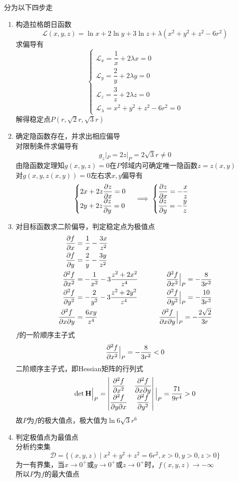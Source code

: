 \begin{analysis}
分为以下四步走
\begin{enumerate}
\item 构造拉格朗日函数
\[\mathcal{L}(x,y,z)=\ln x+2\ln y+3\ln z+\lambda(x^2+y^2+z^2-6r^2)\]
求偏导有
\[\begin{cases}
\mathcal{L}_x=\dfrac{1}{x}+2\lambda x=0\\
\mathcal{L}_y=\dfrac{2}{y}+2\lambda y=0\\
\mathcal{L}_z=\dfrac{3}{z}+2\lambda z=0\\
\mathcal{L}_\lambda=x^2+y^2+z^2-6r^2=0
\end{cases}\]
解得稳定点$P(r,\sqrt{2}r,\sqrt{3}r)$
\item 确定隐函数存在，并求出相应偏导\\
对限制条件求偏导有
\[g_z|_{P}=2z|_{P}=2\sqrt{3}r\ne 0\]
由隐函数定理知$g(x,y,z)=0$在$P$邻域内可确定唯一隐函数$z=z(x,y)$\\
对$g(x,y,z(x,y))=0$左右求$x,y$偏导有
\[\begin{cases}
2x+2z\dfrac{\partial z}{\partial x}=0\\
2y+2z\dfrac{\partial z}{\partial y}=0
\end{cases}
\implies
\begin{cases}
\dfrac{\partial z}{\partial x}=-\dfrac{x}{z}\\
\dfrac{\partial z}{\partial y}=-\dfrac{y}{z}
\end{cases}\]
\item 对目标函数求二阶偏导，判定稳定点为极值点
\[\begin{aligned}
\dfrac{\partial f}{\partial x}&=\frac{1}{x}-\frac{3x}{z^2}\qquad&\\
\dfrac{\partial f}{\partial y}&=\frac{2}{y}-\frac{3y}{z^2}\qquad&\\
\dfrac{\partial^2 f}{\partial x^2}&=-\frac{1}{x^2}-3\frac{z^2+2x^2}{z^4}\qquad& \dfrac{\partial^2 f}{\partial x^2}\Big|_P=-\frac{8}{3r^2}\\
\dfrac{\partial^2 f}{\partial y^2}&=-\frac{2}{y^2}-3\frac{z^2+2y^2}{z^4}\qquad& \dfrac{\partial^2 f}{\partial y^2}\Big|_P=-\frac{10}{3r^2}\\
\dfrac{\partial^2 f}{\partial x\partial y}&=\frac{6xy}{z^4}\qquad& \dfrac{\partial^2 f}{\partial x\partial y}\Big|_P=-\frac{2\sqrt{2}}{3r}
\end{aligned}\]
$f$的一阶顺序主子式
\[\dfrac{\partial^2 f}{\partial x^2}\Big|_P=-\frac{8}{3r^2}<0\]
二阶顺序主子式，即Hessian矩阵的行列式
\[\det\mathbf{H}\Big|_P=\begin{vmatrix}\dfrac{\partial^2 f}{\partial x^2} & \dfrac{\partial^2 f}{\partial x\partial y}\\\dfrac{\partial^2 f}{\partial y\partial x} & \dfrac{\partial^2 f}{\partial y^2}\end{vmatrix}\Big|_P=\frac{71}{9r^4}>0\]
故$P$为$f$的极大值点，极大值为$\ln 6\sqrt{3}r^6$
\item 判定极值点为最值点\\
分析约束集
\[\mathcal{D}=\{(x,y,z)\mid x^2+y^2+z^2=6r^2,x>0,y>0,z>0\}\]
为一有界集，当$x\to 0^+$或$y\to 0^+$或$z\to 0^+$时，$f(x,y,z)\to -\infty$\\
所以$P$为$f$的最大值点
\end{enumerate}
\end{analysis}